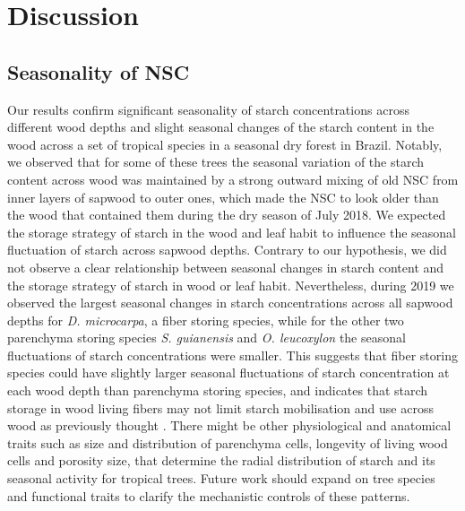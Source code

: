 \documentclass{article}
\begin{document}



\section{Discussion}

\subsection{ Seasonality of NSC}

Our results confirm significant seasonality of starch concentrations across different wood depths and slight seasonal changes of the starch content in the wood across a set of tropical species in a seasonal dry forest in Brazil. Notably, we observed that for some of these trees the seasonal variation of the starch content across wood was maintained by a strong outward mixing of old NSC from inner layers of sapwood to outer ones, which made the NSC to look older than the wood that contained them during the dry season of July 2018. We expected the storage strategy of starch in the wood and leaf habit to influence the seasonal fluctuation of starch across sapwood depths. Contrary to our hypothesis, we did not observe a clear relationship between seasonal changes in starch content and the storage strategy of starch in wood or leaf habit. Nevertheless, during 2019 we observed the largest seasonal changes in starch concentrations across all sapwood depths for \textit{D. microcarpa}, a fiber storing species, while for the other two parenchyma storing species \textit{S. guianensis} and \textit{O. leucoxylon} the seasonal fluctuations of starch concentrations were smaller. This suggests that fiber storing species could have slightly larger seasonal fluctuations of starch concentration at each wood depth than parenchyma storing species, and indicates that starch storage in wood living fibers may not limit starch mobilisation and use across wood as previously thought \citep{Herrera-remirez:2021}. There might be other physiological and anatomical traits such as size and distribution of parenchyma cells, longevity of living wood cells and porosity size, that determine the radial distribution of starch and its seasonal activity for tropical trees. Future work should expand on tree species and functional traits to clarify the mechanistic controls of these patterns.
\end{document}
